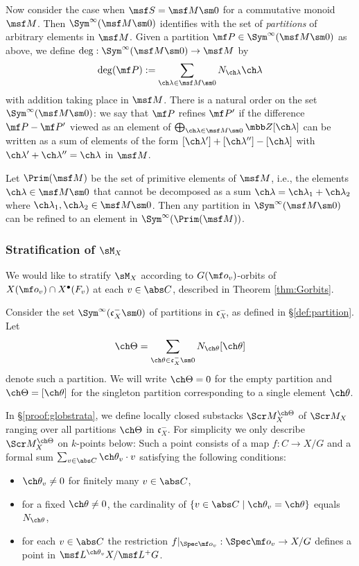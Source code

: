 Now consider the case when $\msf S = \msf M\sm 0$ for a commutative monoid
$\msf M$. Then $\Sym^\infty(\msf M\sm 0)$ identifies with the set of
\emph{partitions} of arbitrary elements in $\msf M$.
Given a partition $\mf P\in \Sym^\infty(\msf M\sm 0)$ as above,
we define $\deg : \Sym^\infty(\msf M\sm 0) \to \msf M$ by
\[
    \deg(\mf P) := \sum_{\ch\lambda\in \msf M\sm 0} N_{\ch\lambda}\ch\lambda
\]
with addition taking place in $\msf M$.
There is a natural order on the set $\Sym^\infty(\msf M\sm 0)$:
we say that $\mf P$ refines $\mf P'$ if the difference $\mf P-\mf P'$
viewed as an element of $\bigoplus_{\ch\lambda\in \msf M\sm 0}
 \mbb Z [\ch\lambda]$ can be written as a sum of elements of the
form $[\ch\lambda']+[\ch\lambda'']-[\ch\lambda]$ with $\ch\lambda'+\ch\lambda''=\ch\lambda$ in $\msf M$.

Let $\Prim(\msf M)$ be the set of primitive elements of $\msf M$, i.e.,
the elements $\ch\lambda\in \msf M\sm 0$ that cannot be decomposed
as a sum $\ch\lambda=\ch\lambda_1+\ch\lambda_2$ where $\ch\lambda_1,\ch\lambda_2 \in \msf M\sm 0$. Then any partition in $\Sym^\infty(\msf M\sm 0)$
can be refined to an element in $\Sym^\infty(\Prim(\msf M))$.



\subsubsection{Stratification of $\sM_X$}

\label{sect:globstrat}


We would like to stratify $\sM_X$ according to $G(\mf o_v)$-orbits of
$X(\mf o_v)\cap X^\bullet(F_v)$ at each $v\in \abs C$, described in Theorem \ref{thm:Gorbits}.


Consider the set $\Sym^\infty(\mathfrak c_X^-\sm 0)$
of partitions in $\mathfrak c_X^-$, as defined
in \S\ref{def:partition}.
Let
\[ \ch\Theta = \sum_{\ch\theta\in \mathfrak c_X^- \sm 0} N_{\ch\theta} [\ch\theta] \]
denote such a partition.
We will write $\ch\Theta=0$ for the empty partition and
$\ch\Theta=[\ch\theta]$ for the singleton partition corresponding to a
single element $\ch\theta$.

In \S\ref{proof:globstrata}, we define locally closed substacks $\Scr M^{\ch\Theta}_X$ of $\Scr M_X$ ranging over all partitions
$\ch\Theta$ in $\mathfrak c_X^-$.
For simplicity we only describe $\Scr M^{\ch\Theta}_X$ on $k$-points below:
Such a point consists of a map $f : C\to X/G$ and a formal sum
$\sum_{v\in \abs C} \ch\theta_v \cdot v$ satisfying the following
conditions:
\begin{itemize}
\item $\ch\theta_v \ne 0$ for finitely many $v\in \abs C$,
\item for a fixed $\ch\theta \ne 0$, the cardinality of $\{ v\in \abs C \mid \ch\theta_v =\ch\theta\}$ equals $N_{\ch\theta}$,
\item for each $v\in \abs C$
the restriction $f|_{\Spec \mf o_v} : \Spec \mf o_v \to X/G$ defines a point in $\msf L^{\ch\theta_v} X / \msf L^+ G$.
\end{itemize}

